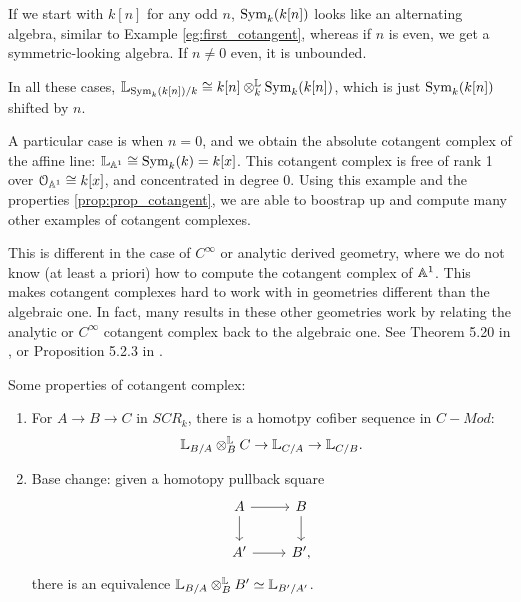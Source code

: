\begin{eg}
If we start with $k[n]$ for any odd $n$, $\operatorname{Sym}_k(k[n])$ looks like an alternating algebra, similar to Example \ref{eg:first_cotangent},
whereas if $n$ is even, we get a symmetric-looking algebra. If $n\neq 0$ even, it is unbounded.

In all these cases, $\mathbb L_{\operatorname{Sym}_k(k[n])/k} \cong k[n] \otimes^{\mathbb L}_k \operatorname{Sym}_k(k[n])$, which is just $\operatorname{Sym}_k(k[n])$ shifted by $n$.
\end{eg}

\begin{rem}
A particular case is when $n=0$, and we obtain the absolute cotangent complex of the affine line: $\mathbb L_{\mathbb A^1} \cong \operatorname{Sym}_k(k) = k[x]$.
This cotangent complex is free of rank 1 over $\mathcal O_{\mathbb A^1} \cong k[x]$, and concentrated in degree 0. Using this example and
the properties \ref{prop:prop_cotangent}, we are able to boostrap up and compute many other examples of cotangent complexes.

This is different in the case of $C^{\infty}$ or analytic derived geometry, where we do not know (at least a priori) how to 
compute the cotangent complex of $\mathbb A^1$. This makes cotangent complexes hard to work with in geometries different than
the algebraic one. In fact, many results in these other geometries work by relating the analytic or $C^{\infty}$
 cotangent complex back to the algebraic one. See Theorem 5.20 in \cite{porta_yue_yu}, or Proposition 5.2.3 in \cite{spivak2010}.
\end{rem}

Some properties of cotangent complex:
\begin{prop}
\label{prop:prop_cotangent}
\;
\begin{enumerate}
\item For $A \to B \to C$ in $SCR_k$, there is a homotpy cofiber sequence in $C-Mod$:
\[	\mathbb L_{B/A} \otimes^{\mathbb L}_B C \to \mathbb L_{C/A} \to \mathbb L_{C/B}.	\]
\item Base change: given a homotopy pullback square
\[
\begin{tikzcd}
A\arrow{r}\arrow{d} & B\arrow{d} \\
A'\arrow{r} & B',
\end{tikzcd}
\]
there is an equivalence $\mathbb L_{B/A} \otimes^{\mathbb L}_B B' \simeq \mathbb L_{B'/A'}$.
\end{enumerate}
\end{prop}

